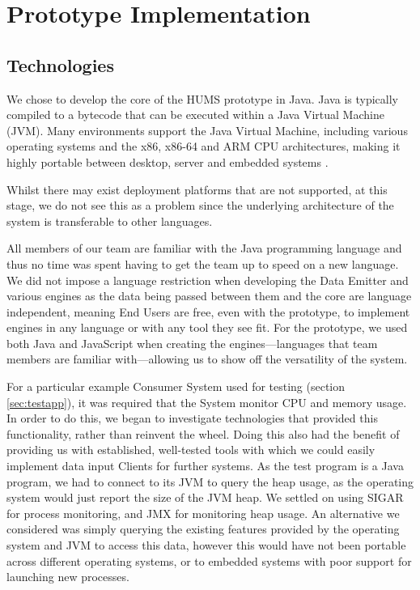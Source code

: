 \documentclass[10pt,a4paper]{article}
\begin{document}
\section{Prototype Implementation}
\label{sec:prototype}

\subsection{Technologies}

We chose to develop the core of the HUMS prototype in Java. Java is typically
compiled to a bytecode that can be executed within a Java Virtual Machine (JVM).
Many environments support the Java Virtual Machine, including various
operating systems and the x86, x86-64 and ARM CPU architectures,
making it highly portable between desktop, server and embedded
systems \cite{javasupport}.

Whilst there may exist deployment platforms that are not supported, at
this stage, we do not see this as a problem since the underlying
architecture of the system is transferable to other languages.

All members of our team are familiar with the Java programming
language and thus no time was spent having to get the team up to speed
on a new language. We did not impose a language restriction when
developing the Data Emitter and various engines as the data being
passed between them and the core are language independent, meaning 
End Users are free, even with the prototype, to implement engines in any
language or with any tool they see fit. For the prototype, we used both Java and
JavaScript when creating the engines---languages that team members are
familiar with---allowing us to show off the versatility of the system.

For a particular example Consumer System used for testing (section
\ref{sec:testapp}), it was required that the System monitor CPU and memory usage.
In order to do this, we began to investigate
technologies that provided this functionality, rather than reinvent the wheel.
Doing this also had the benefit of providing us with established, well-tested
tools with which we could easily implement data input Clients for further
systems. As the test program is a Java program, we had to connect to its 
JVM to query the heap usage, as the operating system would just report the 
size of the JVM heap. We settled on using SIGAR for process monitoring, 
and JMX for monitoring heap usage. An alternative we considered was 
simply querying the existing features provided by the operating system 
and JVM to access this data, however this would have not been portable 
across different operating systems, or to embedded systems with poor 
support for launching new processes.
\end{document}
